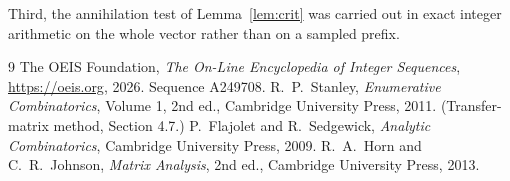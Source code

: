 \documentclass[11pt,a4paper]{article}
\theoremstyle{plain}
\theoremstyle{definition}
\begin{document}
Third, the annihilation test of Lemma~\ref{lem:crit} was carried out in exact integer
arithmetic on the whole vector rather than on a sampled prefix.

\begin{thebibliography}{9}
 The OEIS Foundation, \emph{The On-Line Encyclopedia of Integer
Sequences}, \url{https://oeis.org}, 2026. Sequence A249708.
 R.~P.~Stanley, \emph{Enumerative Combinatorics}, Volume 1, 2nd ed.,
Cambridge University Press, 2011. (Transfer-matrix method, Section 4.7.)
 P.~Flajolet and R.~Sedgewick, \emph{Analytic Combinatorics}, Cambridge
University Press, 2009.
 R.~A.~Horn and C.~R.~Johnson, \emph{Matrix Analysis}, 2nd ed., Cambridge
University Press, 2013.
\end{thebibliography}
\end{document}
